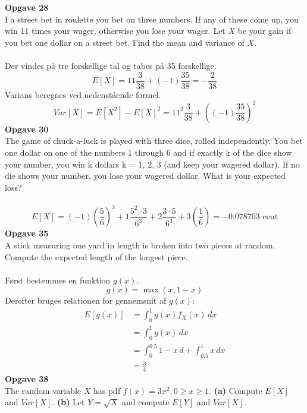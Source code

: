 \documentclass[12pt,a4paper,draft]{report}
\author{Frederik Appel Vardinghus-Nielsen}
\begin{document}
\noindent \textbf{Opgave 28}\\
I a street bet in roulette you bet on three numbers. If any of these come up, you win 11 times your wager, otherwise you lose your wager. Let $X$ be your gain if you bet one dollar on a street bet. Find the mean and variance of $X$.\\\\
Der vindes på tre forskellige tal og tabes på 35 forskellige.
\begin{equation}
E[X]=11\frac{3}{38}+(-1)\frac{35}{38}=-\frac{2}{38}
\end{equation}
Varians beregnes ved nedenstående formel.
\begin{equation}
Var[X]=E[X^2]-E[X]^2=11^2\frac{3}{38}+\left((-1)\frac{35}{38}\right)^2
\end{equation}
\textbf{Opgave 30}\\
The game of chuck-a-luck is played with three dice, rolled independently. You
bet one dollar on one of the numbers 1 through 6 and if exactly k of the dice show
your number, you win k dollars k = 1, 2, 3 (and keep your wagered dollar). If
no die shows your number, you lose your wagered dollar. What is your expected
loss?\\\\
\begin{equation}
E[X]=(-1)\left(\frac{5}{6}\right)^3+1\frac{5^2\cdot3}{6^3}+2\frac{3\cdot5}{6^3}+3\left(\frac{1}{6}\right)=-0.078703\text{ cent}
\end{equation}
\textbf{Opgave 35}\\
A stick measuring one yard in length is broken into two pieces at random.
Compute the expected length of the longest piece.\\\\
Først bestemmes en funktion $g(x)$.
\begin{equation}
g(x)=\max(x,1-x)
\end{equation}
Derefter bruges relationen for gennemsnit af $g(x)$:
\begin{align}
E[g(x)]&=\int_0^1\!g(x)f_X(x)\,dx\\
&=\int_0^1\!g(x)\,dx\\
&=\int_0^{0.5}\!1-x\,d+\int_{0.5}^1\!x\,dx\\
&=\frac{3}{4}
\end{align}
\textbf{Opgave 38}\\
The random variable $X$ has pdf $f(x)=3x^2,0\geq x\geq 1$. \textbf{(a)} Compute $E[X]$ and
$Var[X]$. \textbf{(b)} Let $Y=\sqrt{X}$ and compute $E[Y]$ and $Var[X]$.\\\\
\end{document}
